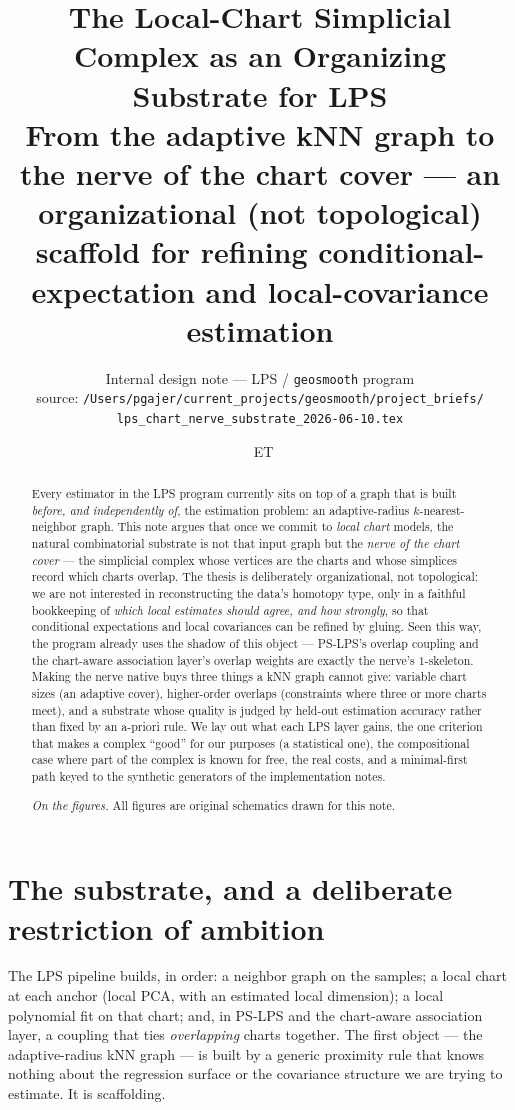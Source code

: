 \documentclass[11pt]{article}
\title{\textbf{The Local-Chart Simplicial Complex as an Organizing Substrate
for LPS}\\[4pt]
\large From the adaptive kNN graph to the nerve of the chart cover --- an
organizational (not topological) scaffold for refining conditional-expectation
and local-covariance estimation}
\author{\small Internal design note --- LPS / \texttt{geosmooth} program\\[2pt]
\footnotesize source: \nolinkurl{/Users/pgajer/current_projects/geosmooth/project_briefs/}\\[1pt]
\footnotesize\nolinkurl{lps_chart_nerve_substrate_2026-06-10.tex}}
\date{\DTMnow\ \textnormal{\footnotesize ET}}
\theoremstyle{definition}
\begin{document}
\maketitle

\begin{abstract}\noindent
Every estimator in the LPS program currently sits on top of a graph that is built
\emph{before, and independently of}, the estimation problem: an adaptive-radius
$k$-nearest-neighbor graph. This note argues that once we commit to \emph{local
chart} models, the natural combinatorial substrate is not that input graph but the
\emph{nerve of the chart cover} --- the simplicial complex whose vertices are the
charts and whose simplices record which charts overlap. The thesis is
deliberately organizational, not topological: we are not interested in
reconstructing the data's homotopy type, only in a faithful bookkeeping of
\emph{which local estimates should agree, and how strongly}, so that conditional
expectations and local covariances can be refined by gluing. Seen this way, the
program already uses the shadow of this object --- PS-LPS's overlap coupling and
the chart-aware association layer's overlap weights are exactly the nerve's
$1$-skeleton. Making the nerve native buys three things a kNN graph cannot give:
variable chart sizes (an adaptive cover), higher-order overlaps (constraints where
three or more charts meet), and a substrate whose quality is judged by held-out
estimation accuracy rather than fixed by an a-priori rule. We lay out what each
LPS layer gains, the one criterion that makes a complex ``good'' for our purposes
(a statistical one), the compositional case where part of the complex is known for
free, the real costs, and a minimal-first path keyed to the synthetic generators
of the implementation notes.
\par\medskip\noindent\footnotesize\textit{On the figures.} All figures are
original schematics drawn for this note.
\end{abstract}

{\small\tableofcontents}

\section{The substrate, and a deliberate restriction of ambition}\label{sec:thesis}

The LPS pipeline builds, in order: a neighbor graph on the samples; a local chart
at each anchor (local PCA, with an estimated local dimension); a local polynomial
fit on that chart; and, in PS-LPS and the chart-aware association layer, a
coupling that ties \emph{overlapping} charts together. The first object --- the
adaptive-radius kNN graph --- is built by a generic proximity rule that knows
nothing about the regression surface or the covariance structure we are trying to
estimate. It is scaffolding.
\end{document}
